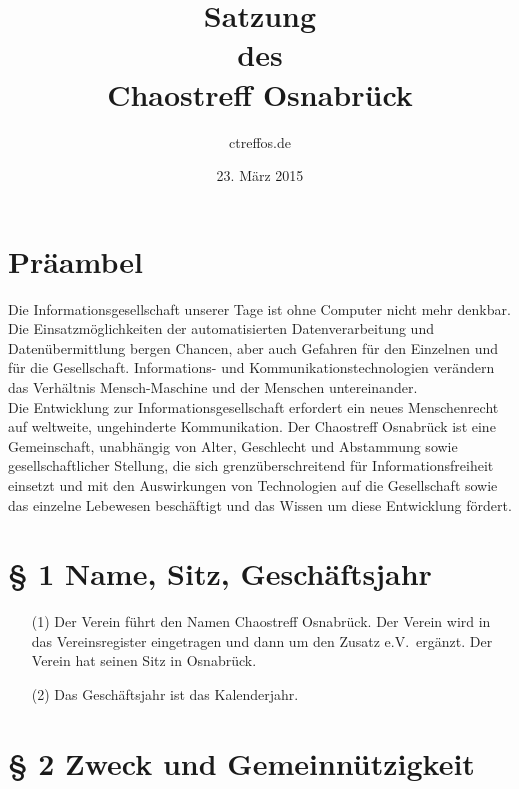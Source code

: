 \documentclass[12pt,paper=a4,ngerman]{scrreprt}
\title{Satzung\\des\\Chaostreff Osnabrück} \author{ctreffos.de}
\date{23. März 2015}
\begin{document}
\maketitle
\tableofcontents
\newpage

\section{Präambel}

Die Informationsgesellschaft unserer Tage ist ohne Computer nicht mehr
denkbar. Die Einsatzmöglichkeiten der automatisierten
Datenverarbeitung und Datenübermittlung bergen Chancen, aber auch
Gefahren für den Einzelnen und für die Gesellschaft. Infor\-mations-
und Kommunikationstechnologien verändern das Verhältnis
Mensch-Maschine und der Menschen untereinander. \\
Die Entwicklung zur Informationsgesellschaft erfordert ein neues
Menschenrecht auf weltweite, ungehinderte Kommunikation. Der
Chaostreff Osnabrück ist eine Gemeinschaft, unabhängig von Alter,
Geschlecht und Abstammung sowie gesellschaftlicher Stellung, die sich
grenzüberschreitend für Informationsfreiheit einsetzt und mit den
Auswirkungen von Technologien auf die Gesellschaft sowie das einzelne
Lebewesen beschäftigt und das Wissen um diese Entwicklung fördert.

\section{\S{} 1 Name, Sitz, Geschäftsjahr}

\begin{itemize}
\item[(1)]
Der Verein führt den Namen \glqq Chaostreff
Osnabrück\grqq. Der Verein wird in das Vereinsregister eingetragen und
dann um den Zusatz \glqq e.V.\grqq\ ergänzt. Der Verein hat seinen
Sitz in Osnabrück.
\item[(2)]
Das Geschäftsjahr ist das Kalenderjahr.
\end{itemize}

\section{\S{} 2 Zweck und Gemeinnützigkeit}
\end{document}
